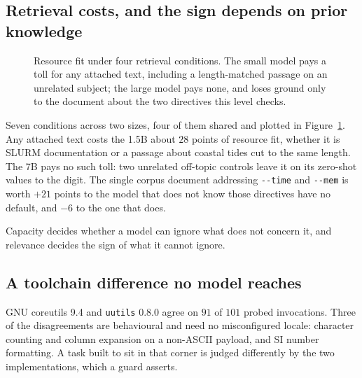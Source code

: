\documentclass[11pt,a4paper]{article}
\begin{document}
\subsection{Retrieval costs, and the sign depends on prior knowledge}

\begin{figure}[t]
\centering
{}
\caption{Resource fit under four retrieval conditions. The small model pays a toll for any attached
text, including a length-matched passage on an unrelated subject; the large model pays none, and
loses ground only to the document about the two directives this level checks.}
\label{fig:retrieval}
\end{figure}

Seven conditions across two sizes, four of them shared and plotted in
Figure~\ref{fig:retrieval}. Any attached text costs the 1.5B about $28$ points of resource fit,
whether it is SLURM documentation or a passage about coastal tides cut to the same length. The 7B
pays no such toll: two unrelated off-topic controls leave it on its zero-shot values to the digit.
The single corpus document addressing \verb|--time| and \verb|--mem| is worth $+21$ points to the
model that does not know those directives have no default, and $-6$ to the one that does.

Capacity decides whether a model can ignore what does not concern it, and relevance decides the
sign of what it cannot ignore.

\subsection{A toolchain difference no model reaches}

GNU coreutils 9.4 and \texttt{uutils} 0.8.0 agree on $91$ of $101$ probed invocations. Three of the
disagreements are behavioural and need no misconfigured locale: character counting and column
expansion on a non-ASCII payload, and SI number formatting. A task built to sit in that corner is
judged differently by the two implementations, which a guard asserts.
\end{document}
